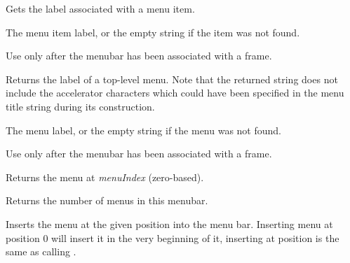 Gets the label associated with a menu item.




The menu item label, or the empty string if the item was not found.


Use only after the menubar has been associated with a frame.

\label{wxmenubargetlabeltop}


Returns the label of a top-level menu. Note that the returned string does not
include the accelerator characters which could have been specified in the menu
title string during its construction.




The menu label, or the empty string if the menu was not found.


Use only after the menubar has been associated with a frame.



\label{wxmenubargetmenu}


Returns the menu at {\it menuIndex} (zero-based).

\label{wxmenubargetmenucount}


Returns the number of menus in this menubar.

\label{wxmenubarinsert}


Inserts the menu at the given position into the menu bar. Inserting menu at
position $0$ will insert it in the very beginning of it, inserting at position 
 is the same as calling 
.

